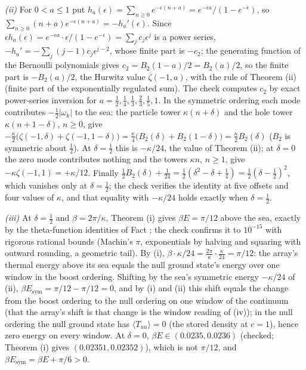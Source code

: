 \emph{(ii)} For $0 < a \le 1$ put $h_{a}(\epsilon) = \sum_{n \ge 0}e^{-\epsilon(n + a)} = e^{-\epsilon a}/(1 - e^{-\epsilon})$, so $\sum_{n \ge 0}(n + a)e^{-\epsilon(n + a)} = -h_{a}'(\epsilon)$. Since $\epsilon h_{a}(\epsilon) = e^{-\epsilon a}\cdot\epsilon/(1 - e^{-\epsilon}) = \sum_{j}c_{j}\epsilon^{j}$ is a power series, $-h_{a}' = -\sum_{j}(j - 1)c_{j}\epsilon^{j - 2}$, whose finite part is $-c_{2}$; the generating function of the Bernoulli polynomials gives $c_{2} = B_{2}(1 - a)/2 = B_{2}(a)/2$, so the finite part is $-B_{2}(a)/2$, the Hurwitz value $\zeta(-1, a)$, with the rule of Theorem (ii) (finite part of the exponentially regulated sum). The check computes $c_{2}$ by exact power-series inversion for $a = \tfrac12, \tfrac14, \tfrac13, \tfrac23, \tfrac15, 1$. In the symmetric ordering each mode contributes $-\tfrac12|\omega_{k}|$ to the sea: the particle tower $\kappa(n + \delta)$ and the hole tower $\kappa(n + 1 - \delta)$, $n \ge 0$, give $-\tfrac{\kappa}{2}\bigl(\zeta(-1, \delta) + \zeta(-1, 1 - \delta)\bigr) = \tfrac{\kappa}{4}\bigl(B_{2}(\delta) + B_{2}(1 - \delta)\bigr) = \tfrac{\kappa}{2}B_{2}(\delta)$ ($B_{2}$ is symmetric about $\tfrac12$). At $\delta = \tfrac12$ this is $-\kappa/24$, the value of Theorem (ii); at $\delta = 0$ the zero mode contributes nothing and the towers $\kappa n$, $n \ge 1$, give $-\kappa\zeta(-1, 1) = +\kappa/12$. Finally $\tfrac12B_{2}(\delta) + \tfrac1{24} = \tfrac12(\delta^{2} - \delta + \tfrac14) = \tfrac12(\delta - \tfrac12)^{2}$, which vanishes only at $\delta = \tfrac12$; the check verifies the identity at five offsets and four values of $\kappa$, and that equality with $-\kappa/24$ holds exactly when $\delta = \tfrac12$.

\emph{(iii)} At $\delta = \tfrac12$ and $\beta = 2\pi/\kappa$, Theorem (i) gives $\beta E = \pi/12$ above the sea, exactly by the theta-function identities of Fact ; the check confirms it to $10^{-15}$ with rigorous rational bounds (Machin's $\pi$, exponentials by halving and squaring with outward rounding, a geometric tail). By (i), $\beta\cdot\kappa/24 = \tfrac{2\pi}{\kappa}\cdot\tfrac{\kappa}{24} = \pi/12$: the array's thermal energy above its sea equals the null ground state's energy over one window in the boost ordering. Shifting by the sea's symmetric energy $-\kappa/24$ of (ii), $\beta E_{\mathrm{sym}} = \pi/12 - \pi/12 = 0$, and by (i) and (ii) this shift equals the change from the boost ordering to the null ordering on one window of the continuum (that the array's shift is that change is the window reading of (iv)); in the null ordering the null ground state has $\langle T_{uu}\rangle = 0$ (the stored density at $c = 1$), hence zero energy on every window. At $\delta = 0$, $\beta E \in (0.0235, 0.0236)$ (checked; Theorem (i) gives $(0.02351, 0.02352)$), which is not $\pi/12$, and $\beta E_{\mathrm{sym}} = \beta E + \pi/6 > 0$.

